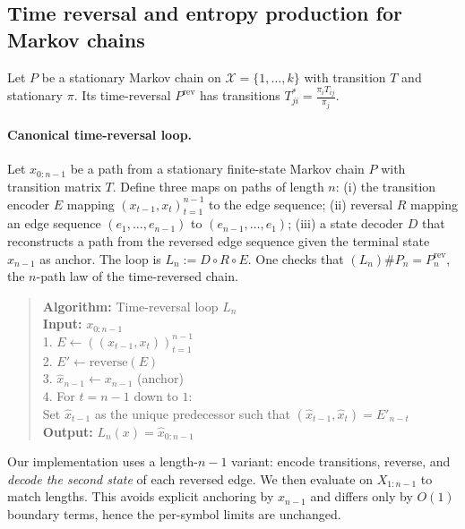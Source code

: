 \documentclass[11pt]{article}
\newcommand{\X}{\mathcal{X}}
\newcommand{\1}{\mathbbm{1}}
\begin{document}
\subsection{Time reversal and entropy production for Markov chains}

Let $P$ be a stationary Markov chain on $\X=\{1,\dots,k\}$ with transition $T$ and stationary $\pi$. Its time-reversal $P^{\mathrm{rev}}$ has transitions $T^\ast_{ji}=\frac{\pi_i T_{ij}}{\pi_j}$. 

\paragraph{Canonical time-reversal loop.}
Let $x_{0:n-1}$ be a path from a stationary finite-state Markov chain $P$ with transition matrix $T$.
Define three maps on paths of length $n$:
(i) the transition encoder $E$ mapping $(x_{t-1},x_t)_{t=1}^{n-1}$ to the edge sequence;
(ii) reversal $R$ mapping an edge sequence $(e_1,\dots,e_{n-1})$ to $(e_{n-1},\dots,e_1)$;
(iii) a state decoder $D$ that reconstructs a path from the reversed edge sequence given the terminal
state $x_{n-1}$ as anchor.
The loop is $L_n := D \circ R \circ E$. One checks that $(L_n)\# P_n = P_n^{\mathrm{rev}}$,
the $n$-path law of the time-reversed chain.

\begin{quote}
\textbf{Algorithm:} Time-reversal loop $L_n$\\
\textbf{Input:} $x_{0:n-1}$\\
1. $E \leftarrow ((x_{t-1},x_t))_{t=1}^{n-1}$\\
2. $E' \leftarrow \mathrm{reverse}(E)$\\
3. $\hat{x}_{n-1} \leftarrow x_{n-1}$ \quad (anchor)\\
4. For $t=n-1$ down to $1$:\\
\quad Set $\hat{x}_{t-1}$ as the unique predecessor such that $(\hat{x}_{t-1},\hat{x}_{t})=E'_{n-t}$\\
\textbf{Output:} $L_n(x)=\hat{x}_{0:n-1}$
\end{quote}

\begin{remark}
Our implementation uses a length-$n\!-\!1$ variant:
encode transitions, reverse, and \emph{decode the second state} of each reversed
edge. We then evaluate on $X_{1:n-1}$ to match lengths. This avoids explicit
anchoring by $x_{n-1}$ and differs only by $O(1)$ boundary terms, hence the
per-symbol limits are unchanged.
\end{remark}
\end{document}
